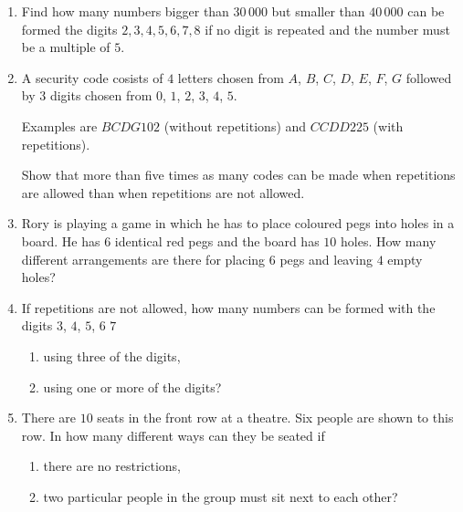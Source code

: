 \begin{enumerate}
	\item Find how many numbers bigger than $30\,000$ but smaller than $40\,000$ can be formed the digits $2,3,4,5,6,7,8$ if no digit is repeated and the number must be a multiple of $5$. 
	
	\item A security code cosists of $4$ letters chosen from $A$, $B$, $C$, $D$, $E$, $F$, $G$  followed by $3$ digits chosen from $0$, $1$, $2$, $3$, $4$, $5$.
	
	Examples are $BCDG102$ (without repetitions) and $CCDD225$ (with repetitions).
	
	Show that more than five times as many codes can be made when repetitions are allowed than when repetitions are not allowed.
	
	
	\item  Rory is playing a game in which he has to place coloured pegs into holes in a board. He has $6$ identical red pegs and the board has $10$ holes. How many different arrangements are there for placing $6$ pegs and leaving $4$ empty holes?  
	
	\item If repetitions are not allowed, how many numbers can be formed with the digits $3$, $4$, $5$, $6$ $7$ 
	\begin{enumerate}
		\item using three of the digits,
		\item using one or more of the digits? 
	\end{enumerate}


  \item  There are $10$ seats in the front row at a theatre. Six people are shown to this row. In how many different ways can they be seated if 
  \begin{enumerate}
  	\item there are no restrictions,
  	\item two particular people in the group must sit next to each other?
  \end{enumerate}
	
\end{enumerate}


\newpage
